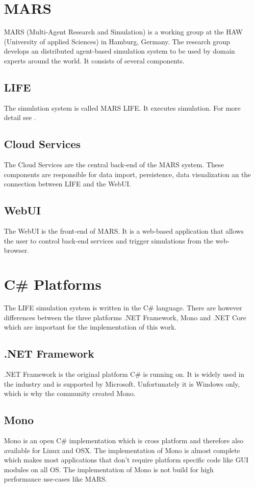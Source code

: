 \section{MARS}
MARS (Multi-Agent Research and Simulation) is a working group at the HAW (University of applied Sciences) in Hamburg, Germany. The research group develops an distributed agent-based simulation system \citep{Wooldridge2009} to be used by domain experts around the world. It consists of several components.


\subsection{LIFE}
The simulation system is called MARS LIFE. It executes simulation. For more detail see \cite{Huning2016}.


\subsection{Cloud Services}
The Cloud Services are the central back-end of the MARS system. These components are responsible for data import, persistence, data visualization an the connection between LIFE and the WebUI.


\subsection{WebUI}
The WebUI is the front-end of MARS. It is a web-based application that allows the user to control back-end services and trigger simulations from the web-browser.



\section{C\# Platforms}
The LIFE simulation system is written in the C\# language. There are however differences between the three platforms .NET Framework, Mono and .NET Core which are important for the implementation of this work.


\subsection{.NET Framework}
.NET Framework is the original platform C\# is running on. It is widely used in the industry and is supported by Microsoft. Unfortunately it is Windows only, which is why the community created Mono.

\subsection{Mono}
Mono is an open C\# implementation which is cross platform and therefore also available for Linux and OSX. The implementation of Mono is almost complete which makes most applications that don't require platform specific code like GUI modules on all OS. The implementation of Mono is not build for high performance use-cases like MARS.

